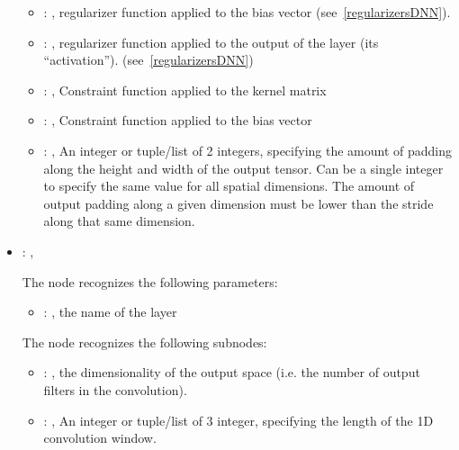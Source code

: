 \begin{itemize}
\begin{itemize}
        \item {}: , 
          regularizer function applied to the bias vector (see~\ref{regularizersDNN}).

        \item {}: , 
          regularizer function applied to the output         of the layer (its ``activation'').
          (see~\ref{regularizersDNN})

        \item {}: , 
          Constraint function applied to the kernel matrix

        \item {}: , 
          Constraint function applied to the bias vector

        \item {}: , 
          An integer or tuple/list of 2 integers, specifying the amount of padding along the height
          and         width of the output tensor. Can be a single integer to specify the same value
          for all spatial dimensions.         The amount of output padding along a given dimension
          must be lower than the stride along that same dimension.
      \end{itemize}

    \item {}: , 

      The  node recognizes the following parameters:
        \begin{itemize}
          \item {}: , 
            the name of the layer
      \end{itemize}

      The  node recognizes the following subnodes:
      \begin{itemize}
        \item {}: , 
          the dimensionality of the output space (i.e. the number of output filters in the
          convolution).

        \item {}: , 
          An integer or tuple/list of 3 integer, specifying the length of the 1D convolution window.


\end{itemize}
\end{itemize}
